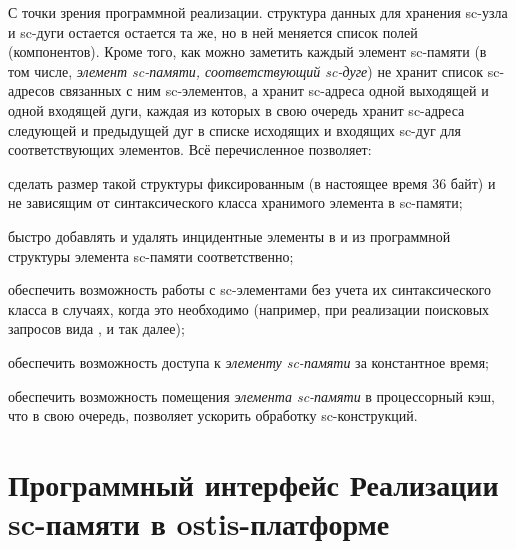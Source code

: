 С точки зрения программной реализации. структура данных для хранения sc-узла и sc-дуги остается остается та же, но в ней меняется список полей (компонентов). Кроме того, как можно заметить каждый элемент sc-памяти (в том числе, \textit{элемент sc-памяти, соответствующий sc-дуге}) не хранит список sc-адресов связанных с ним sc-элементов, а хранит sc-адреса одной выходящей и одной входящей дуги, каждая из которых в свою очередь хранит sc-адреса следующей и предыдущей дуг в списке исходящих и входящих sc-дуг для соответствующих элементов. Всё перечисленное позволяет:

\begin{textitemize}
	\item сделать размер такой структуры фиксированным (в настоящее время 36 байт) и не зависящим от синтаксического класса хранимого элемента в sc-памяти;
	\item быстро добавлять и удалять инцидентные элементы в и из программной структуры элемента sc-памяти соответственно;
	\item обеспечить возможность работы с sc-элементами без учета их синтаксического класса в случаях, когда это необходимо (например, при реализации поисковых запросов вида ,  и так далее);
	\item обеспечить возможность доступа к \textit{элементу sc-памяти} за константное время;
	\item обеспечить возможность помещения \textit{элемента sc-памяти} в процессорный кэш, что в свою очередь, позволяет ускорить обработку sc-конструкций.
\end{textitemize}

\section{Программный интерфейс Реализации sc-памяти в ostis-платформе}
\label{sec_soft_platform_sc_memory_interface}

